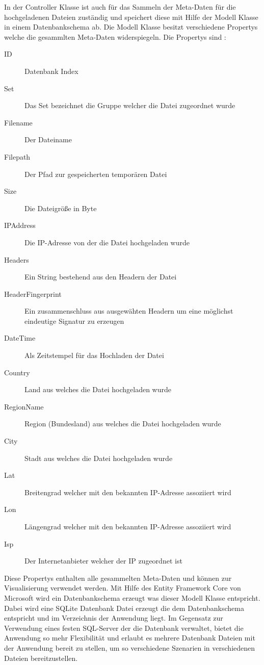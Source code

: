 \documentclass[
    fontsize=12pt,
    headings=small,
    parskip=half,           %
    bibliography=totoc,
    numbers=noenddot,       %
    open=any,               %
    ]{scrreprt}
\begin{document}
In der Controller Klasse ist auch für das Sammeln der Meta-Daten für die hochgeladenen Dateien zuständig und speichert diese mit Hilfe der Modell Klasse in einem Datenbankschema ab. Die Modell Klasse besitzt verschiedene Propertys welche die gesammlten Meta-Daten widerspiegeln. 
Die Propertys sind : 

\begin{description}
\item[ID] Datenbank Index
\item[Set] Das Set bezeichnet die Gruppe welcher die Datei zugeordnet wurde
\item[Filename] Der Dateiname
\item[Filepath] Der Pfad zur gespeicherten temporären Datei
\item[Size] Die Dateigröße in Byte
\item[IPAddress] Die IP-Adresse von der die Datei hochgeladen wurde
\item[Headers] Ein String bestehend aus den Headern der Datei
\item[HeaderFingerprint] Ein zusammenschluss aus ausgewähten Headern um eine möglichst eindeutige Signatur zu erzeugen
\item[DateTime] Als Zeitstempel für das Hochladen der Datei
\item[Country] Land aus welches die Datei hochgeladen wurde
\item[RegionName] Region (Bundesland) aus welches die Datei hochgeladen wurde
\item[City] Stadt aus welches die Datei hochgeladen wurde
\item[Lat] Breitengrad welcher mit den bekannten IP-Adresse assoziiert wird
\item[Lon] Längengrad welcher mit den bekannten IP-Adresse assoziiert wird
\item[Isp] Der Internetanbieter welcher der IP zugeordnet ist
\end{description}

Diese Propertys enthalten alle gesammelten Meta-Daten und können zur Visualisierung verwendet werden. 
Mit Hilfe des Entity Framework Core von Microsoft wird ein Datenbankschema erzeugt was dieser Modell Klasse entspricht. 
Dabei wird eine SQLite Datenbank Datei erzeugt die dem Datenbankschema entspricht und im Verzeichnis der Anwendung liegt.
Im Gegensatz zur Verwendung eines festen SQL-Server der die Datenbank verwaltet, bietet die Anwendung so mehr Flexibilität und erlaubt es mehrere Datenbank Dateien mit der Anwendung bereit zu stellen, um so verschiedene Szenarien in verschiedenen Dateien bereitzustellen.
\end{document}
